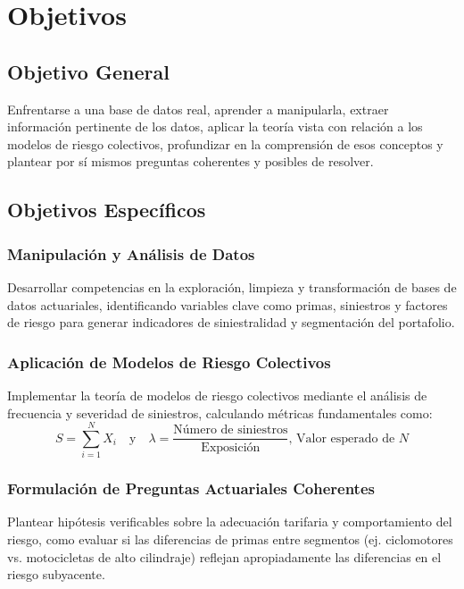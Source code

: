 \section{Objetivos}

\subsection{Objetivo General}
Enfrentarse a una base de datos real, aprender a manipularla, extraer información pertinente de los datos, aplicar la teoría vista con relación a los modelos de riesgo colectivos, profundizar en la comprensión de esos conceptos y plantear por sí mismos preguntas coherentes y posibles de resolver.
\subsection{Objetivos Específicos}
\subsubsection{Manipulación y Análisis de Datos}
Desarrollar competencias en la exploración, limpieza y transformación de bases de datos actuariales, identificando variables clave como primas, siniestros y factores de riesgo para generar indicadores de siniestralidad y segmentación del portafolio.
\subsubsection{Aplicación de Modelos de Riesgo Colectivos}
Implementar la teoría de modelos de riesgo colectivos mediante el análisis de frecuencia y severidad de siniestros, calculando métricas fundamentales como:
\begin{equation}
S = \sum_{i=1}^{N} X_i \quad \text{y} \quad \lambda = \frac{\text{Número de siniestros}}{\text{Exposición}} \text{, Valor esperado de $N$}
\end{equation}
\subsubsection{Formulación de Preguntas Actuariales Coherentes}
Plantear hipótesis verificables sobre la adecuación tarifaria y comportamiento del riesgo, como evaluar si las diferencias de primas entre segmentos (ej. ciclomotores vs. motocicletas de alto cilindraje) reflejan apropiadamente las diferencias en el riesgo subyacente.